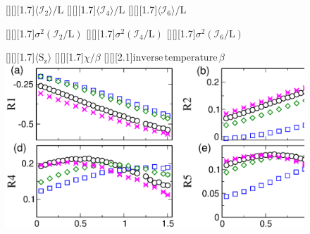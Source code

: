 \documentclass[12pt]{article}
\begin{document}

\begin{figure}
[][][1.7]{$\langle{\mathcal I}_2\rangle/\mathrm{L}$}
[][][1.7]{$\langle{\mathcal I}_4\rangle/\mathrm{L}$}
[][][1.7]{$\langle{\mathcal I}_6\rangle/\mathrm{L}$}

[][][1.7]{$\sigma^2({\mathcal I}_2/\mathrm{L})$}
[][][1.7]{$\sigma^2({\mathcal I}_4/\mathrm{L})$}
[][][1.7]{$\sigma^2({\mathcal I}_6/\mathrm{L})$}

[][][1.7]{$\langle \mathrm{S_z}\rangle$}
[][][1.7]{$\chi/\beta$}
[][][2.1]{$\mathrm{inverse}\, \mathrm{temperature}\, \beta$}
\includegraphics{fig1.eps}
\end{figure}
\end{document}
